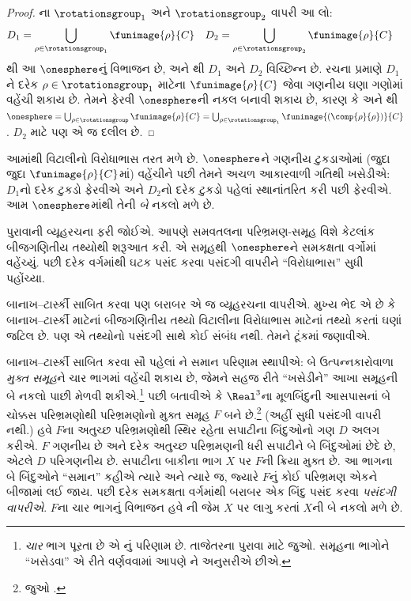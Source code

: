 \begin{proof}
ના
$\rotationsgroup_{1}$ અને
$\rotationsgroup_{2}$ વાપરી આ લો:
\begin{align*}
	D_{1} &= \bigcup_{\rho \in \rotationsgroup_1} \funimage{\rho}{C} & 
	D_{2} &= \bigcup_{\rho \in \rotationsgroup_2} \funimage{\rho}{C}
\end{align*}
થી આ
$\onesphere$નું વિભાજન છે, અને
થી
$D_1$ અને $D_2$ વિચ્છિન્ન છે.
રચના પ્રમાણે $D_1$ને દરેક
$\rho \in \rotationsgroup_1$ માટેના
$\funimage{\rho}{C}$ જેવા ગણનીય
ઘણા ગણોમાં વહેંચી શકાય છે.
તેમને ફેરવી $\onesphere$ની
નકલ બનાવી શકાય છે, કારણ કે
 અને
થી
$\onesphere = \bigcup_{\rho \in
\rotationsgroup}\funimage{\rho}{C} =
\bigcup_{\rho \in
\rotationsgroup_1}\funimage{(\comp{\rho}{\rho})}{C}$.
$D_2$ માટે પણ એ જ દલીલ છે.
\end{proof}\noindent
આમાંથી વિટાલીનો વિરોધાભાસ
તરત મળે છે. $\onesphere$ને
ગણનીય ટુકડાઓમાં (જુદા જુદા
$\funimage{\rho}{C}$માં) વહેંચીને
પછી તેમને અચળ આકારવાળી ગતિથી
ખસેડીએ: $D_1$નો દરેક ટુકડો
ફેરવીએ અને $D_2$નો દરેક ટુકડો
પહેલાં સ્થાનાંતરિત કરી પછી
ફેરવીએ. આમ $\onesphere$માંથી
તેની \emph{બે} નકલો મળે છે.

પુરાવાની વ્યૂહરચના ફરી જોઈએ.
આપણે સમવતલના પરિભ્રમણ-સમૂહ
વિશે કેટલાંક બીજગણિતીય તથ્યોથી
શરૂઆત કરી. એ સમૂહથી
$\onesphere$ને સમકક્ષતા વર્ગોમાં
વહેંચ્યું. પછી દરેક વર્ગમાંથી
ઘટક પસંદ કરવા પસંદગી વાપરીને
``વિરોધાભાસ'' સુધી પહોંચ્યા.

બાનાખ--ટાર્સ્કી સાબિત કરવા પણ
બરાબર એ જ વ્યૂહરચના વાપરીએ.
મુખ્ય ભેદ એ છે કે બાનાખ--ટાર્સ્કી
માટેનાં બીજગણિતીય તથ્યો
વિટાલીના વિરોધાભાસ માટેનાં
તથ્યો કરતાં ઘણાં જટિલ છે.
પણ એ તથ્યોનો પસંદગી સાથે
કોઈ સંબંધ નથી. તેમને ટૂંકમાં
જણાવીએ.

બાનાખ--ટાર્સ્કી સાબિત કરવા
સૌ પહેલાં ને
સમાન પરિણામ સ્થાપીએ: બે ઉત્પન્નકારોવાળા
\emph{મુક્ત સમૂહ}ને ચાર ભાગમાં
વહેંચી શકાય છે, જેમને સહજ રીતે
``ખસેડીને'' આખા સમૂહની બે
નકલો પાછી મેળવી શકીએ.\footnote{
\emph{ચાર} ભાગ પૂરતા છે એ
\cite{Robinson1947}નું પરિણામ છે.
તાજેતરના પુરાવા માટે
\citet[Theorem 5.2]{Wagon2016} જુઓ.
સમૂહના ભાગોને ``ખસેડવા''
એ રીતે વર્ણવવામાં આપણે
\citet[p.~3]{Weston2003}ને
અનુસરીએ છીએ.}
પછી બતાવીએ કે $\Real^3$ના
મૂળબિંદુની આસપાસનાં બે ચોક્કસ
પરિભ્રમણોથી પરિભ્રમણોનો
મુક્ત સમૂહ $F$ બને છે.\footnote{જુઓ
\citet[Theorem 2.1]{Wagon2016}.}
(અહીં સુધી પસંદગી વાપરી નથી.)
હવે $F$ના અતુચ્છ પરિભ્રમણોથી સ્થિર રહેતા સપાટીના બિંદુઓનો
ગણ $D$ અલગ કરીએ. $F$ ગણનીય છે અને દરેક અતુચ્છ પરિભ્રમણની ધરી
સપાટીને બે બિંદુઓમાં છેદે છે, એટલે $D$ પરિગણનીય છે. સપાટીના
બાકીના ભાગ $X$ પર $F$ની ક્રિયા મુક્ત છે. આ ભાગના બે બિંદુઓને
``સમાન'' કહીએ ત્યારે અને ત્યારે જ, જ્યારે $F$નું કોઈ પરિભ્રમણ
એકને બીજામાં લઈ જાય. પછી દરેક સમકક્ષતા વર્ગમાંથી બરાબર એક
બિંદુ પસંદ કરવા \emph{પસંદગી વાપરીએ}. $F$ના ચાર ભાગનું વિભાજન
હવે ની જેમ $X$ પર લાગુ કરતાં $X$ની
બે નકલો મળે છે.

